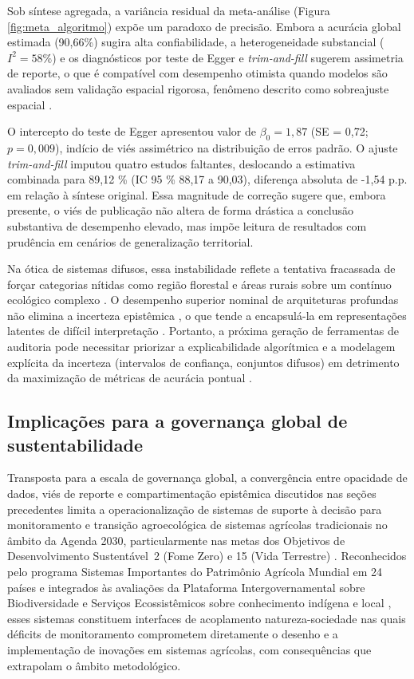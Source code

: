 \documentclass[lineno,pdflatex,sn-apa]{sn-jnl}%
\begin{document}
Sob síntese agregada, a variância residual da meta-análise (Figura \ref{fig:meta_algoritmo}) expõe um paradoxo de precisão. Embora a acurácia global estimada (90,66\%) sugira alta confiabilidade, a heterogeneidade substancial ($I^2=58\%$) e os diagnósticos por teste de Egger e \textit{trim-and-fill} sugerem assimetria de reporte, o que é compatível com desempenho otimista quando modelos são avaliados sem validação espacial rigorosa, fenômeno descrito como sobreajuste espacial \citep{Ploton2020,Meyer2021}.

O intercepto do teste de Egger apresentou valor de $\beta_0=1{,}87$ (SE = 0,72; $p=0{,}009$), indício de viés assimétrico na distribuição de erros padrão. O ajuste \textit{trim-and-fill} imputou quatro estudos faltantes, deslocando a estimativa combinada para 89,12 \% (IC 95 \% 88,17 a 90,03), diferença absoluta de -1,54 p.p. em relação à síntese original. Essa magnitude de correção sugere que, embora presente, o viés de publicação não altera de forma drástica a conclusão substantiva de desempenho elevado, mas impõe leitura de resultados com prudência em cenários de generalização territorial.

Na ótica de sistemas difusos, essa instabilidade reflete a tentativa fracassada de forçar categorias nítidas como região florestal e áreas rurais sobre um contínuo ecológico complexo \citep{Fisher2010}. O desempenho superior nominal de arquiteturas profundas não elimina a incerteza epistêmica \citep{Hullermeier2021}, o que tende a encapsulá-la em representações latentes de difícil interpretação \citep{Tuia2021}. Portanto, a próxima geração de ferramentas de auditoria pode necessitar priorizar a explicabilidade algorítmica e a modelagem explícita da incerteza (intervalos de confiança, conjuntos difusos) em detrimento da maximização de métricas de acurácia pontual \citep{Rudin2019,Ghilardi2025}.

\subsection[Implicações para a governança global de sustentabilidade]{Implicações para a governança global de sustentabilidade}

Transposta para a escala de governança global, a convergência entre opacidade de dados, viés de reporte e compartimentação epistêmica discutidos nas seções precedentes limita a operacionalização de sistemas de suporte à decisão para monitoramento e transição agroecológica de sistemas agrícolas tradicionais \citep{Wezel2009} no âmbito da Agenda 2030, particularmente nas metas dos Objetivos de Desenvolvimento Sustentável~2 (Fome Zero) e 15 (Vida Terrestre) \citep{UN2015}. Reconhecidos pelo programa Sistemas Importantes do Patrimônio Agrícola Mundial em 24 países e integrados às avaliações da Plataforma Intergovernamental sobre Biodiversidade e Serviços Ecossistêmicos sobre conhecimento indígena e local \citep{Koohafkan2011,IPBES2019}, esses sistemas constituem interfaces de acoplamento natureza-sociedade nas quais déficits de monitoramento comprometem diretamente o desenho e a implementação de inovações em sistemas agrícolas, com consequências que extrapolam o âmbito metodológico.
\end{document}
